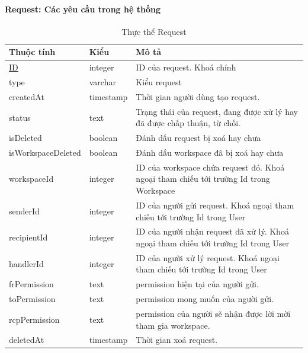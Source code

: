 \paragraph{Request: Các yêu cầu trong hệ thống}
\begin{center}
\begin{table}[!h]
        \begin{tabular}{ |p{3cm} |p{3cm} |p{9cm}|} 
                \hline
                   Thuộc tính & Kiểu & Mô tả \\ [0.5ex] 
                \hline
                \underline{ID} & integer & ID của request. Khoá chính \\ 
                \hline
                type & varchar & Kiểu request \\
                \hline
                createdAt & timestamp & Thời gian người dùng tạo request.\\
                \hline
                status & text & Trạng thái của request, đang được xử lý hay đã được chấp thuận, từ chối.\\
                \hline
                isDeleted & boolean & Đánh dấu request bị xoá hay chưa \\
                \hline
                isWorkspaceDeleted & boolean & Đánh dấu workspace đã bị xoá hay chưa \\
                \hline
                workspaceId & integer & ID của workspace chứa request đó. Khoá ngoại tham chiếu tới trường Id trong Workspace \\
                \hline
                 senderId & integer & ID của người gửi request. Khoá ngoại tham chiếu tới trường Id trong User \\
                \hline
                 recipientId & integer & ID của người nhận request đã xử lý. Khoá ngoại tham chiếu tới trường Id trong User \\
                \hline
                 handlerId & integer & ID của người xử lý request. Khoá ngoại tham chiếu tới trường Id trong User \\
                \hline
                 frPermission & text & permission hiện tại của người gửi. \\
                \hline
                 toPermission & text & permission mong muốn của người gửi. \\
                \hline
                 rcpPermission & text & permission của người sẽ nhận được lời mời tham gia workspace. \\
                \hline
                 deletedAt & timestamp & Thời gian xoá request. \\
                \hline
               \end{tabular}
                        \caption{Thực thể Request}
\end{table}
\end{center}
